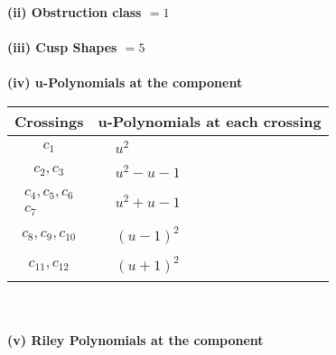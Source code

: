\documentclass[1p]{elsarticle_modified}
\theoremstyle{definition}
\begin{document}
\flushleft \textbf{(ii) Obstruction class $= 1$}\\~\\
\flushleft \textbf{(iii) Cusp Shapes $= 5$}\\~\\
\newpage\renewcommand{\arraystretch}{1}
\flushleft \textbf{(iv) u-Polynomials at the component}\newline \\
\begin{tabular}{m{50pt}|m{274pt}}
Crossings & \hspace{64pt}u-Polynomials at each crossing \\
\hline $$\begin{aligned}c_{1}\end{aligned}$$&$\begin{aligned}
&u^2
\end{aligned}$\\
\hline $$\begin{aligned}c_{2},c_{3}\end{aligned}$$&$\begin{aligned}
&u^2- u-1
\end{aligned}$\\
\hline $$\begin{aligned}c_{4},c_{5},c_{6}\\c_{7}\end{aligned}$$&$\begin{aligned}
&u^2+u-1
\end{aligned}$\\
\hline $$\begin{aligned}c_{8},c_{9},c_{10}\end{aligned}$$&$\begin{aligned}
&(u-1)^2
\end{aligned}$\\
\hline $$\begin{aligned}c_{11},c_{12}\end{aligned}$$&$\begin{aligned}
&(u+1)^2
\end{aligned}$\\
\hline
\end{tabular}\\~\\
\newpage\renewcommand{\arraystretch}{1}
\flushleft \textbf{(v) Riley Polynomials at the component}\newline \\
\end{document}
